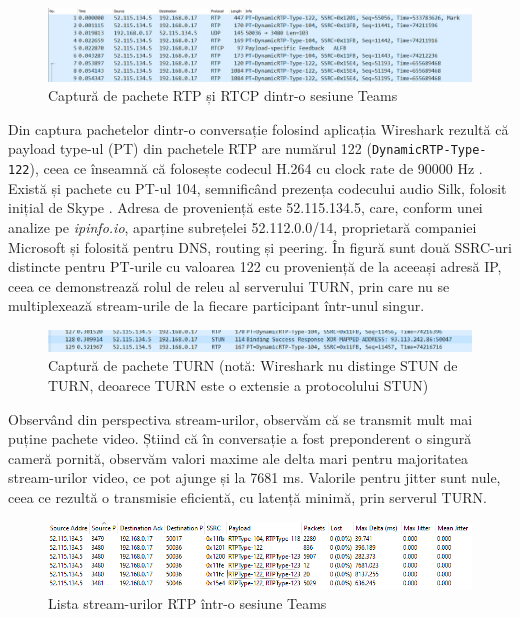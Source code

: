 \begin{figure}[!htbp]
    \centering
    \includegraphics[width=15.6cm]{figures/ms_teams_rtp_capture.png}
    \caption{Captură de pachete RTP și RTCP dintr-o sesiune Teams}
    \label{TeamsRTPCapture}
\end{figure}
\indent \par Din captura pachetelor dintr-o conversație folosind aplicația Wireshark rezultă că payload type-ul (PT) din pachetele RTP are numărul 122 (\texttt{DynamicRTP-Type-122}), ceea ce înseamnă că folosește codecul H.264 cu clock rate de 90000 Hz \cite{MicrosoftRTP}. Există și pachete cu PT-ul 104, semnificând prezența codecului audio Silk, folosit inițial de Skype \cite{MicrosoftRTP}. Adresa de proveniență este 52.115.134.5, care, conform unei analize pe \textit{ipinfo.io}, aparține subrețelei 52.112.0.0/14, proprietară companiei Microsoft și folosită pentru DNS, routing și peering. În figură sunt două SSRC-uri distincte pentru PT-urile cu valoarea 122 cu proveniență de la aceeași adresă IP, ceea ce demonstrează rolul de releu al serverului TURN, prin care nu se multiplexează stream-urile de la fiecare participant într-unul singur.
\begin{figure}[!htbp]
    \centering
    \includegraphics[width=15.6cm]{figures/ms_teams_stun_capture.png}
    \caption{Captură de pachete TURN (notă: Wireshark nu distinge STUN de TURN, deoarece TURN este o extensie a protocolului STUN)}
    \label{TeamsSTUNCapture}
\end{figure}
\indent \par Observând din perspectiva stream-urilor, observăm că se transmit mult mai puține pachete video. Știind că în conversație a fost preponderent o singură cameră pornită, observăm valori maxime ale delta mari pentru majoritatea stream-urilor video, ce pot ajunge și la 7681 ms. Valorile pentru jitter sunt nule, ceea ce rezultă o transmisie eficientă, cu latență minimă, prin serverul TURN.
\begin{figure}[!htbp]
    \centering
    \includegraphics[width=15.6cm]{figures/ms_teams_rtp_streams.png}
    \caption{Lista stream-urilor RTP într-o sesiune Teams}
    \label{TeamsRTPStreams}
\end{figure}

